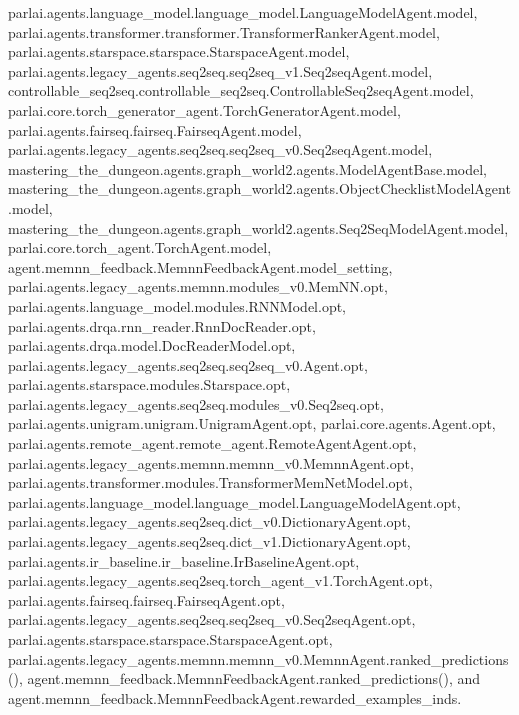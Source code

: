 parlai.\+agents.\+language\+\_\+model.\+language\+\_\+model.\+Language\+Model\+Agent.\+model, parlai.\+agents.\+transformer.\+transformer.\+Transformer\+Ranker\+Agent.\+model, parlai.\+agents.\+starspace.\+starspace.\+Starspace\+Agent.\+model, parlai.\+agents.\+legacy\+\_\+agents.\+seq2seq.\+seq2seq\+\_\+v1.\+Seq2seq\+Agent.\+model, controllable\+\_\+seq2seq.\+controllable\+\_\+seq2seq.\+Controllable\+Seq2seq\+Agent.\+model, parlai.\+core.\+torch\+\_\+generator\+\_\+agent.\+Torch\+Generator\+Agent.\+model, parlai.\+agents.\+fairseq.\+fairseq.\+Fairseq\+Agent.\+model, parlai.\+agents.\+legacy\+\_\+agents.\+seq2seq.\+seq2seq\+\_\+v0.\+Seq2seq\+Agent.\+model, mastering\+\_\+the\+\_\+dungeon.\+agents.\+graph\+\_\+world2.\+agents.\+Model\+Agent\+Base.\+model, mastering\+\_\+the\+\_\+dungeon.\+agents.\+graph\+\_\+world2.\+agents.\+Object\+Checklist\+Model\+Agent.\+model, mastering\+\_\+the\+\_\+dungeon.\+agents.\+graph\+\_\+world2.\+agents.\+Seq2\+Seq\+Model\+Agent.\+model, parlai.\+core.\+torch\+\_\+agent.\+Torch\+Agent.\+model, agent.\+memnn\+\_\+feedback.\+Memnn\+Feedback\+Agent.\+model\+\_\+setting, parlai.\+agents.\+legacy\+\_\+agents.\+memnn.\+modules\+\_\+v0.\+Mem\+N\+N.\+opt, parlai.\+agents.\+language\+\_\+model.\+modules.\+R\+N\+N\+Model.\+opt, parlai.\+agents.\+drqa.\+rnn\+\_\+reader.\+Rnn\+Doc\+Reader.\+opt, parlai.\+agents.\+drqa.\+model.\+Doc\+Reader\+Model.\+opt, parlai.\+agents.\+legacy\+\_\+agents.\+seq2seq.\+seq2seq\+\_\+v0.\+Agent.\+opt, parlai.\+agents.\+starspace.\+modules.\+Starspace.\+opt, parlai.\+agents.\+legacy\+\_\+agents.\+seq2seq.\+modules\+\_\+v0.\+Seq2seq.\+opt, parlai.\+agents.\+unigram.\+unigram.\+Unigram\+Agent.\+opt, parlai.\+core.\+agents.\+Agent.\+opt, parlai.\+agents.\+remote\+\_\+agent.\+remote\+\_\+agent.\+Remote\+Agent\+Agent.\+opt, parlai.\+agents.\+legacy\+\_\+agents.\+memnn.\+memnn\+\_\+v0.\+Memnn\+Agent.\+opt, parlai.\+agents.\+transformer.\+modules.\+Transformer\+Mem\+Net\+Model.\+opt, parlai.\+agents.\+language\+\_\+model.\+language\+\_\+model.\+Language\+Model\+Agent.\+opt, parlai.\+agents.\+legacy\+\_\+agents.\+seq2seq.\+dict\+\_\+v0.\+Dictionary\+Agent.\+opt, parlai.\+agents.\+legacy\+\_\+agents.\+seq2seq.\+dict\+\_\+v1.\+Dictionary\+Agent.\+opt, parlai.\+agents.\+ir\+\_\+baseline.\+ir\+\_\+baseline.\+Ir\+Baseline\+Agent.\+opt, parlai.\+agents.\+legacy\+\_\+agents.\+seq2seq.\+torch\+\_\+agent\+\_\+v1.\+Torch\+Agent.\+opt, parlai.\+agents.\+fairseq.\+fairseq.\+Fairseq\+Agent.\+opt, parlai.\+agents.\+legacy\+\_\+agents.\+seq2seq.\+seq2seq\+\_\+v0.\+Seq2seq\+Agent.\+opt, parlai.\+agents.\+starspace.\+starspace.\+Starspace\+Agent.\+opt, parlai.\+agents.\+legacy\+\_\+agents.\+memnn.\+memnn\+\_\+v0.\+Memnn\+Agent.\+ranked\+\_\+predictions(), agent.\+memnn\+\_\+feedback.\+Memnn\+Feedback\+Agent.\+ranked\+\_\+predictions(), and agent.\+memnn\+\_\+feedback.\+Memnn\+Feedback\+Agent.\+rewarded\+\_\+examples\+\_\+inds.



